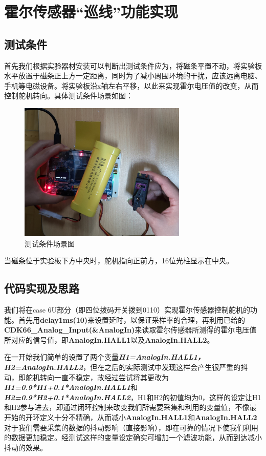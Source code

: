 \section{霍尔传感器“巡线”功能实现}

\subsection{测试条件}
\par{首先我们根据实验器材安装可以判断出测试条件应为，将磁条平置不动，将实验板水平放置于磁条正上方一定距离，同时为了减小周围环境的干扰，应该远离电脑、手机等电磁设备。将实验板沿x轴左右平移，以此来实现霍尔电压值的改变，从而控制舵机转向。具体测试条件场景如图：}

\begin{figure}[H]
\centering
\includegraphics[width=8cm]{figure/HALL测试条件.jpg}
\caption{测试条件场景图} \label{fig:4.1}
\end{figure}

当磁条位于实验板下方中央时，舵机指向正前方，16位光柱显示在中央。

\subsection{代码实现及思路}
\par{我们将在case 6U部分（即四位拨码开关拨到0110）实现霍尔传感器控制舵机的功能。首先用\textbf{delay1ms(10)}来设置延时，以保证采样率的合理，再利用已给的\textbf{CDK66\_Analog\_Input(\&AnalogIn)}来读取霍尔传感器所测得的霍尔电压值所对应的信号值，即\textbf{AnalogIn.HALL1}以及\textbf{AnalogIn.HALL2}。}

\par{在一开始我们简单的设置了两个变量\emph{\textbf{H1=AnalogIn.HALL1，H2=AnalogIn.\-HALL2}}，但在之后的实际测试中发现这样会产生很严重的抖动，即舵机转向一直不稳定，故经过尝试将其更改为\emph{\textbf{H1=0.9*H1+0.1*AnalogIn.HALL1}}和\emph{\textbf{H2=0.9*H2\-+0.1*AnalogIn.HALL2}}，H1和H2的初值均为0，这样的设定让H1和H2参与进去，即通过闭环控制来改变我们所需要采集和利用的变量值，不像最开始的开环定义十分不精确，从而减小\textbf{AnalogIn.HALL1}和\textbf{AnalogIn.HALL2}对于我们需要采集的数据的抖动影响（直接影响），即在可靠的情况下使我们利用的数据更加稳定。经测试这样的变量设定确实可增加一个滤波功能，从而到达减小抖动的效果。}

